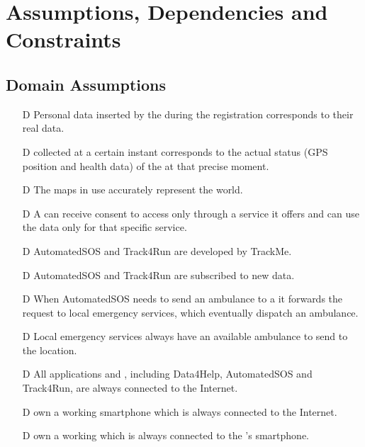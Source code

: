 \documentclass[../../rasd.tex]{subfiles}
\begin{document}
\section{Assumptions, Dependencies and Constraints}
		\subsection{Domain Assumptions}
			 	\begin{itemize}
				 	\item[D\subs{1}]Personal data inserted by the  during the registration corresponds to their real data.
					\item[D\subs{2}] collected at a certain instant corresponds to the actual status (GPS position and health data) of the  at that precise moment.				
					\item[D\subs{4}]The maps in use accurately represent the world.
					\item[D\subs{5}]A  can receive consent to  access only through a service it offers and can use the data only for that specific service.
					\item[D\subs{6}]AutomatedSOS and Track4Run are  developed by TrackMe.
					\item[D\subs{7}]AutomatedSOS and Track4Run are subscribed to new data.
					\item[D\subs{8}]When AutomatedSOS needs to send an ambulance to a  it forwards the request to local emergency services, which eventually dispatch an ambulance.
					\item[D\subs{9}]Local emergency services always have an available ambulance to send to the  location.
					\item[D\subs{10}]All applications and , including Data4Help, AutomatedSOS and Track4Run, are always connected to the Internet.
					\item[D\subs{11}] own a working smartphone which is always connected to the Internet.
					\item[D\subs{12}] own a working  which is always connected to the 's smartphone.



				\end{itemize}		
\end{document}

